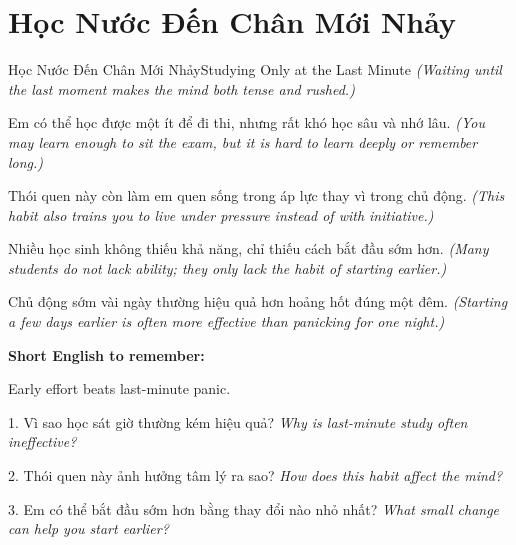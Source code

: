 \section{Học Nước Đến Chân Mới Nhảy}
\begin{truyen}{Học Nước Đến Chân Mới Nhảy}{Studying Only at the Last Minute}
\textit{(Waiting until the last moment makes the mind both tense and rushed.)}

Em có thể học được một ít để đi thi, nhưng rất khó học sâu và nhớ lâu.
\textit{(You may learn enough to sit the exam, but it is hard to learn deeply or remember long.)}

Thói quen này còn làm em quen sống trong áp lực thay vì trong chủ động.
\textit{(This habit also trains you to live under pressure instead of with initiative.)}

Nhiều học sinh không thiếu khả năng, chỉ thiếu cách bắt đầu sớm hơn.
\textit{(Many students do not lack ability; they only lack the habit of starting earlier.)}
\end{truyen}

\begin{baihoc}
Chủ động sớm vài ngày thường hiệu quả hơn hoảng hốt đúng một đêm.
\textit{(Starting a few days earlier is often more effective than panicking for one night.)}
\end{baihoc}

\begin{ghinhoanh}
\textbf{Short English to remember:}

Early effort beats last-minute panic.

\end{ghinhoanh}

\begin{tuhocnhanh}
1. Vì sao học sát giờ thường kém hiệu quả? \textit{Why is last-minute study often ineffective?}

2. Thói quen này ảnh hưởng tâm lý ra sao? \textit{How does this habit affect the mind?}

3. Em có thể bắt đầu sớm hơn bằng thay đổi nào nhỏ nhất? \textit{What small change can help you start earlier?}
\end{tuhocnhanh}
\ngancach

